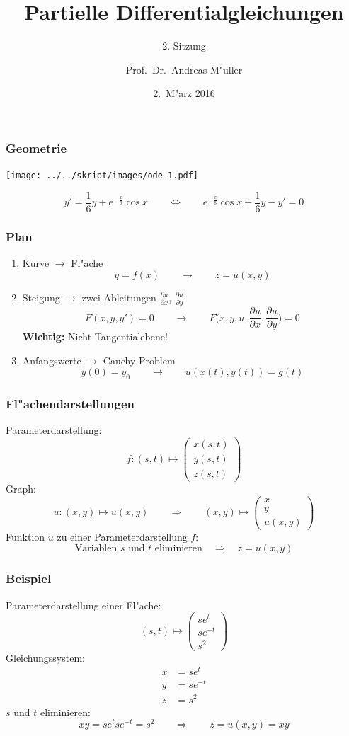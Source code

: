 \documentclass{beamer}
\title[]{Partielle Differentialgleichungen}
\subtitle{2. Sitzung}
\date[2.~M"arz 2016]{2.~M"arz 2016}
\author{Prof.~Dr.~Andreas M"uller}
\begin{document}
\begin{frame}
\titlepage
\end{frame}

\begin{frame}
\frametitle{Geometrie}
\begin{center}
\texttt{[image: ../../skript/images/ode-1.pdf]}
\end{center}
\[
y'=\frac16y+e^{-\frac{x}6}\cos x
\qquad\Leftrightarrow\qquad
e^{-\frac{x}6}\cos x
+
\frac16y
-
y'
=0
\]
\end{frame}

\begin{frame}
\frametitle{Plan}
\begin{enumerate}
\item Kurve
\pause
$\to$ Fl"ache
\[
y = f(x)
\qquad\to \qquad
z = u(x,y)
\]
\pause
\item Steigung
\pause
$\to$ zwei Ableitungen
$\displaystyle\frac{\partial u}{\partial x}$,
$\displaystyle\frac{\partial u}{\partial y}$
\[
F(x,y,y')=0
\qquad\to \qquad
F\biggl(x,y,u,\frac{\partial u}{\partial x},\frac{\partial u}{\partial y}
\biggr)=0
\]
\pause
{\bf Wichtig:} Nicht Tangentialebene!
\pause
\item Anfangswerte
\pause
$\to$ Cauchy-Problem
\[
y(0)=y_0
\qquad\to \qquad
u(x(t),y(t)) = g(t)
\]
\end{enumerate}
\end{frame}

\begin{frame}
\frametitle{Fl"achendarstellungen}
Parameterdarstellung:
\pause
\[
f\colon (s,t)\mapsto\begin{pmatrix}
x(s,t)\\y(s,t)\\z(s,t)
\end{pmatrix}
\]
\pause
Graph:
\pause
\[
u\colon (x,y)\mapsto u(x,y)
\qquad\Rightarrow\qquad
(x,y)\mapsto\begin{pmatrix}
x\\y\\u(x,y)
\end{pmatrix}
\]
\pause
Funktion $u$ zu einer Parameterdarstellung $f$:
\pause
\[
\text{Variablen $s$ und $t$ eliminieren}\quad\Rightarrow\quad
z=u(x,y)
\]
\end{frame}

\begin{frame}
\frametitle{Beispiel}
Parameterdarstellung einer Fl"ache:
\[
(s,t)\mapsto\begin{pmatrix}
se^t\\se^{-t}\\s^2
\end{pmatrix}
\]
Gleichungssystem:
\begin{align*}
x&=se^t\\
y&=se^{-t}\\
z&=s^2
\end{align*}
$s$ und $t$ eliminieren:
\[
xy=se^tse^{-t}=s^2
\qquad\Rightarrow\qquad
z=u(x,y)=xy
\]
\end{frame}
\end{document}
